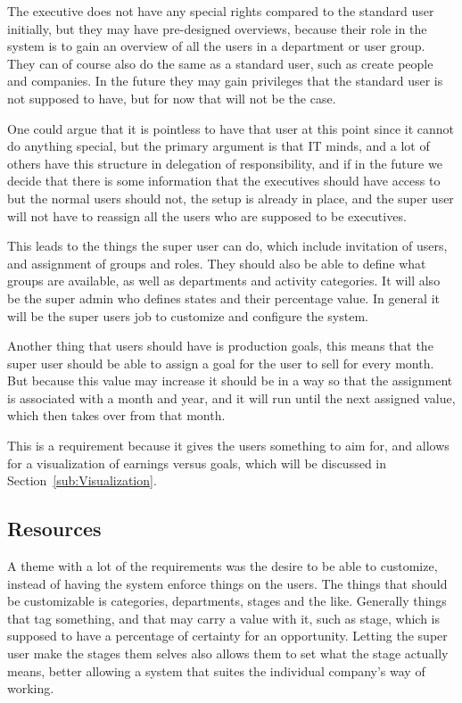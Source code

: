 The executive does not have any special rights compared to the standard user
initially, but they may have pre-designed overviews, because their role in the
system is to gain an overview of all the users in a department or user
group. They can of course also do the same as a standard user, such as create
people and companies. In the future they may gain privileges that the standard
user is not supposed to have, but for now that will not be the case. 

One could argue that it is pointless to have that user at this point since it
cannot do anything special, but the primary argument is that IT minds, and a lot
of others have this structure in delegation of responsibility, and if in the
future we decide that there is some information that the executives should have
access to but the normal users should not, the setup is already in place, and
the super user will not have to reassign all the users who are supposed to be
executives. 

This leads to the things the super user can do, which include invitation of
users, and assignment of groups and roles. They should also be able to define
what groups are available, as well as departments and activity categories. It
will also be the super admin who defines states and their percentage value. In
general it will be the super users job to customize and configure the system.

Another thing that users should have is production goals, this means that the
super user should be able to assign a goal for the user to sell for every month.
But because this value may increase it should be in a way so that the assignment
is associated with a month and year, and it will run until the next assigned
value, which then takes over from that month. 

This is a requirement because it gives the users something to aim for, and
allows for a visualization of earnings versus goals, which will be discussed in
Section~\ref{sub:Visualization}.

\subsection{Resources}
\label{sub:Resources}

A theme with a lot of the requirements was the desire to be able to customize,
instead of having the system enforce things on the users. The things that should
be customizable is categories, departments, stages and the like. Generally
things that tag something, and that may carry a value with it, such as stage,
which is supposed to have a percentage of certainty for an opportunity. Letting
the super user make the stages them selves also allows them to set what the
stage actually means, better allowing a system that suites the individual
company's way of working. 

